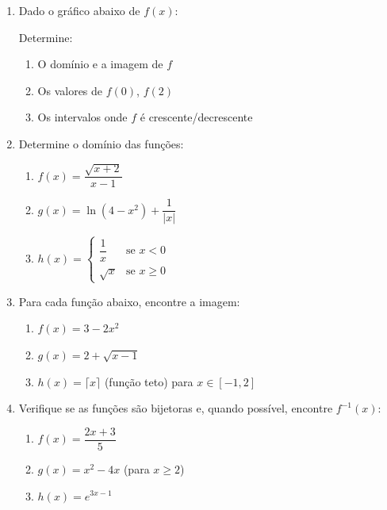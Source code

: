 \documentclass[12pt,a4paper]{article}
\begin{document}
\begin{enumerate}

\item Dado o gráfico abaixo de $f(x)$:
\begin{center}
\end{center}
Determine:
\begin{enumerate}
    \item O domínio e a imagem de $f$
    \item Os valores de $f(0)$, $f(2)$
    \item Os intervalos onde $f$ é crescente/decrescente
\end{enumerate}

\item Determine o domínio das funções:
\begin{enumerate}
    \item $f(x) = \dfrac{\sqrt{x+2}}{x-1}$
    \item $g(x) = \ln(4 - x^2) + \dfrac{1}{|x|}$
    \item $h(x) = \begin{cases} 
      \dfrac{1}{x} & \text{se } x < 0 \\ 
      \sqrt{x} & \text{se } x \geq 0 
    \end{cases}$
\end{enumerate}

\item Para cada função abaixo, encontre a imagem:
\begin{enumerate}
    \item $f(x) = 3 - 2x^2$
    \item $g(x) = 2 + \sqrt{x - 1}$
    \item $h(x) = \lceil x \rceil$ (função teto) para $x \in [-1, 2]$
\end{enumerate}

\item Verifique se as funções são bijetoras e, quando possível, encontre $f^{-1}(x)$:
\begin{enumerate}
    \item $f(x) = \dfrac{2x + 3}{5}$
    \item $g(x) = x^2 - 4x$ (para $x \geq 2$)
    \item $h(x) = e^{3x-1}$
\end{enumerate}


\end{enumerate}
\end{document}

